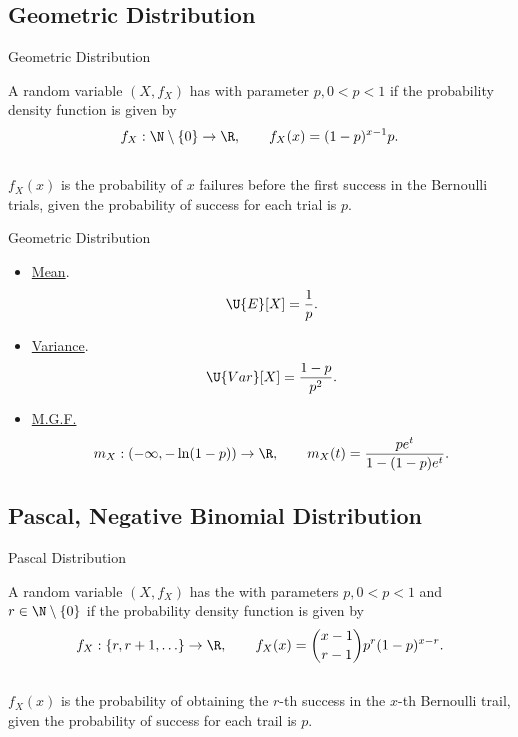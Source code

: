 \subsection{Geometric Distribution}

\begin{frame}{Geometric Distribution}

\justifying
{} A random variable $(X, f_X)$ has  with parameter $p, 0 < p < 1$ if the probability density function is given by
\begin{align*}
f_X: \N\setminus \{0\} \rightarrow \R, \qquad f_X(x) = (1-p)^{x-1} p.
\end{align*}
~\\
 $f_X(x)$ is the probability of $x$ failures before the first success in the Bernoulli trials, given the probability of success for each trial is $p$.

\end{frame}

\begin{frame}{Geometric Distribution}

\justifying
{} 
\begin{itemize}
	\justifying
	\item \underline{Mean}.
	\begin{align*}
	\U{E}[X] = \frac{1}{p}.
	\end{align*}
	\item \underline{Variance}.
	\begin{align*}
	\U{Var}[X] = \frac{1-p}{p^2}.
	\end{align*}
	\item \underline{M.G.F.}
	\begin{align*}
	m_X: (-\infty, -\ln(1-p)) \rightarrow\R, \qquad m_X(t) = \frac{pe^t}{1-(1-p)e^t}.
	\end{align*}
\end{itemize}

\end{frame}

\subsection{Pascal, Negative Binomial Distribution}

\begin{frame}{Pascal Distribution}

\justifying
{} A random variable $(X, f_X)$ has the  with parameters $p, 0 < p < 1$ and $r\in \N\setminus\{0\}$ if the probability density function is given by
\begin{align*}
f_X:\{r, r + 1, \ldots\} \rightarrow \R, \qquad  f_X(x) = \binom{x-1}{r-1} p^r(1-p)^{x-r}.
\end{align*}
~\\
 $f_X(x)$ is the probability of obtaining the $r$-th success in the $x$-th Bernoulli trail, given the probability of success for each trail is $p$.

\end{frame}

